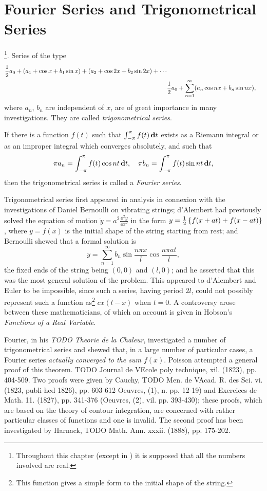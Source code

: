 %
%
\chapter{Fourier Series and Trigonometrical Series}
\footnote{Throughout
  this chapter (except in ) it is supposed that all
  the numbers involved are real.}.
Series of the type
\begin{align*}
  \half a_{0}
  + (a_{1} + \cos x + b_{1} \sin x)
  + (a_{2} + \cos 2x + b_{2} \sin 2x)
  + \cdots
  \\
  &
  \hfill
  \half a_{0}
  +
  \sum_{n=1}^{\infty} ( a_{n} \cos n x + b_{n} \sin n x),
\end{align*}
where $a_{n}$, $b_{n}$ are independent of $x$, are of great importance in many
investigations. They are called \emph{trigonometrical series}.

If there is a function $f(t)$ such that
$\int_{-\pi}^{\pi} f(t) \, \mathbf{d} t$ exists as a Riemann
integral or as an improper integral which converges absolutely, and such that
$$
\pi a_{n} = \int_{-\pi}^{\pi} f(t) \cos nt \, \mathbf{d} t,
\quad
\pi b_{n} = \int_{-\pi}^{\pi} f(t) \sin nt \, \mathbf{d} t,
$$
then the trigonometrical series is called a \emph{Fourier series}.

Trigonometrical series first appeared in analysis in connexion with
the investigations of Daniel Bernoulli on vibrating
strings;
d'Alembert had previously solved the equation of
motion
$ \ddot{y} = a^{2} \frac{\dd^{2} y}{\dd x^{2}}$
in the form
$y = \frac{1}{2} \left\{ f(x+at) + f(x-at) \right\}$, where $y=f(x)$ is
the initial shape of the string starting from rest;
and Bernoulli shewed that a formal solution is
$$
y
=
\sum_{n=1}^{\infty}
b_{n}
\sin \frac{n \pi x}{l}
\cos \frac{n \pi a t}{l},
$$
the fixed ends of the string being $(0,0)$ and $(l,0)$; and he asserted
that this was the most general solution of the problem. This appeared
to d'Alembert and Euler to be impossible, since such a series, having
period $2l$, could not possibly represent such a function
as\footnote{This function gives a simple form to the initial shape of the string.}
$c x (l-x)$ when $t = 0$.
A controversy arose between these mathematicians, of which
an account is given in Hobson's \emph{Functions of a Real Variable}.

Fourier, in his \emph{TODO Theorie de la Chaleur}, investigated a number of
trigonometrical series and shewed that, in a large number of
particular cases, a Fourier series \emph{actually converged to the sum $f(x)$}.
Poisson attempted a general proof of this theorem. TODO Journal de VEcole
poly technique, xil. (1823), pp. 404-509. Two proofs were given by
Cauchy, TODO Men. de VAcad. R. des Sci. vi. (1823, publi-hed 1826), pp.
603-612 Oeuvres, (1), n. pp. 12-19) and Exercices de Math. 11. (1827),
pp. 341-376 (Oeuvres, (2), vil. pp. 393-430); these proofs, which are
based on the theory of contour integration, are concerned with rather
particular classes of functions and one is invalid. The second proof
has been investigated by Harnack, TODO Math. Ann. xxxii. (1888), pp.
175-202.

